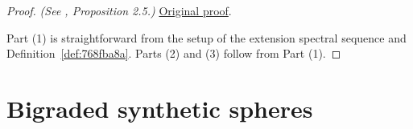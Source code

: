 \begin{proposition}

\sketch
\end{proposition}
\begin{proof}
\textit{(See \cite{LWX126}, Proposition 2.5.)} \href{paper/main.tex.html#L323}{Original proof}.

Part (1) is straightforward from the setup of the extension spectral sequence and Definition~\ref{def:768fba8a}. Parts (2) and (3) follow from Part (1).
\end{proof}


\section{Bigraded synthetic spheres}


